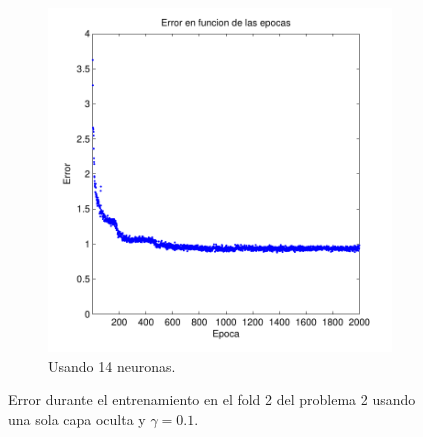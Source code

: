 \documentclass[informe.tex]{subfiles}
\begin{document}
\begin{figure}[H]
        \begin{subfigure}[b]{0.32\textwidth}
                \includegraphics[width=\textwidth]{graficos/error_fold2_14_binary-regresion_2000_01.pdf}
                \caption{Usando 14 neuronas.}
                \label{fig:d2-f2-2k-01-n14}
        \end{subfigure}
        
        \caption{Error durante el entrenamiento en el fold 2 del problema 2 usando una sola capa oculta y $\gamma=0.1$.}\label{fig:p2-f2-gamma01}
    \end{figure}
    
\end{document}
